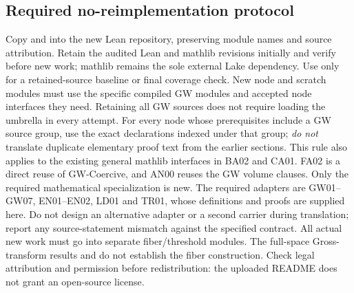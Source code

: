 \documentclass[11pt,a4paper]{article}
\theoremstyle{remark}\newtheorem{remark}[theorem]{Remark}
\begin{document}
\subsection{Required no-reimplementation protocol}
Copy  and  into the new Lean repository, preserving module names and source attribution. Retain the audited Lean and mathlib revisions initially and verify  before new work; mathlib remains the sole external Lake dependency. Use  only for a retained-source baseline or final coverage check. New node and scratch modules must use the specific compiled GW modules and accepted node interfaces they need. Retaining all GW sources does not require loading the umbrella in every attempt. For every node whose prerequisites include a GW source group, use the exact declarations indexed under that group; \emph{do not} translate duplicate elementary proof text from the earlier sections. This rule also applies to the existing general mathlib interfaces in BA02 and CA01. FA02 is a direct reuse of GW-Coercive, and AN00 reuses the GW volume clauses. Only the required mathematical specialization is new. The required adapters are GW01--GW07, EN01--EN02, LD01 and TR01, whose definitions and proofs are supplied here. Do not design an alternative adapter or a second carrier during translation; report any source-statement mismatch against the specified contract. All actual new work must go into separate fiber/threshold modules. The full-space Gross-transform results and  do not establish the fiber construction. Check legal attribution and permission before redistribution: the uploaded README does not grant an open-source license.
\end{document}
